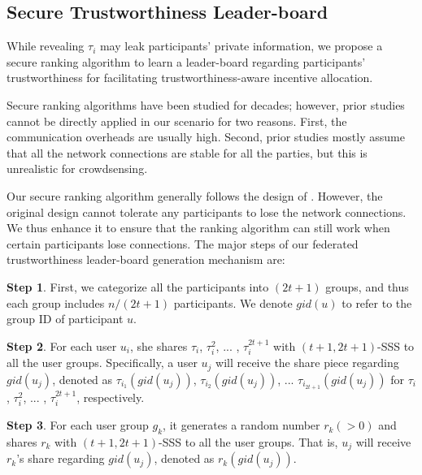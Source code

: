 \subsection{Secure Trustworthiness Leader-board}

While revealing $\tau_i$ may leak participants' private information, we propose a secure ranking algorithm to learn a  leader-board regarding participants' trustworthiness for facilitating trustworthiness-aware incentive allocation.

Secure ranking algorithms have been studied for decades; however, prior studies cannot be directly applied in our scenario for two reasons. First, the communication overheads are usually high. Second, prior studies mostly assume that all the network connections are stable for all the parties, but this is unrealistic for crowdsensing. 

Our secure ranking algorithm generally follows the design of \citet{tang2011secure}. However, the original design \citep{tang2011secure} cannot tolerate any participants to lose the network connections. We thus enhance it to ensure that the ranking algorithm can still work when certain participants lose connections.
The major steps of our federated trustworthiness leader-board generation mechanism are:

\textbf{Step 1}. First, we categorize all the participants into $(2t+1)$ groups, and thus each group includes $n/(2t+1)$ participants. We denote $gid(u)$ to refer to the group ID of participant $u$.

\textbf{Step 2}. For each user $u_i$, she shares $\tau_i$, $\tau_i^2$, ... , $\tau_i^{2t+1}$ with $(t+1, 2t+1)$-SSS to all the user groups. Specifically, a user $u_j$ will receive the share piece regarding $gid(u_j)$, denoted as $\tau_{i_1}(gid(u_j))$, $\tau_{i_2}(gid(u_j))$, ... $\tau_{i_{2t+1}}(gid(u_j))$ for $\tau_i$, $\tau_i^2$, ... , $\tau_i^{2t+1}$, respectively.

\textbf{Step 3}. For each user group $g_k$, it generates a random number $r_k (>0)$ and shares $r_k$ with $(t+1, 2t+1)$-SSS to all the user groups. That is, $u_j$ will receive $r_k$'s share regarding $gid(u_j)$, denoted as $r_k(gid(u_j))$.

